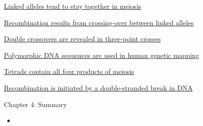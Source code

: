 \documentclass[12pt,letterpaper]{article}
\begin{document}
\hypertarget{4.1}{}
\begin{secbox}{\hyperlink{4}{Linked alleles tend to stay together in meiosis}}{

}\end{secbox}

\hypertarget{4.2}{}
\begin{secbox}{\hyperlink{4}{Recombination results from crossing-over between linked alleles}}{

}\end{secbox}

\hypertarget{4.3}{}
\begin{secbox}{\hyperlink{4}{Double crossovers are revealed in three-point crosses}}{

}\end{secbox}

\hypertarget{4.4}{}
\begin{secbox}{\hyperlink{4}{Polymorphic DNA sequences are used in human genetic mapping}}{

}\end{secbox}

\hypertarget{4.5}{}
\begin{secbox}{\hyperlink{4}{Tetrads contain all four products of meiosis}}{

}\end{secbox}

\hypertarget{4.6}{}
\begin{secbox}{\hyperlink{4}{Recombination is initiated by a double-stranded break in DNA}}{

}\end{secbox}

\begin{probbox}{Chapter 4: Summary}{
    \begin{itemize}
        \item
    \end{itemize}
}\end{probbox}

\end{document}
